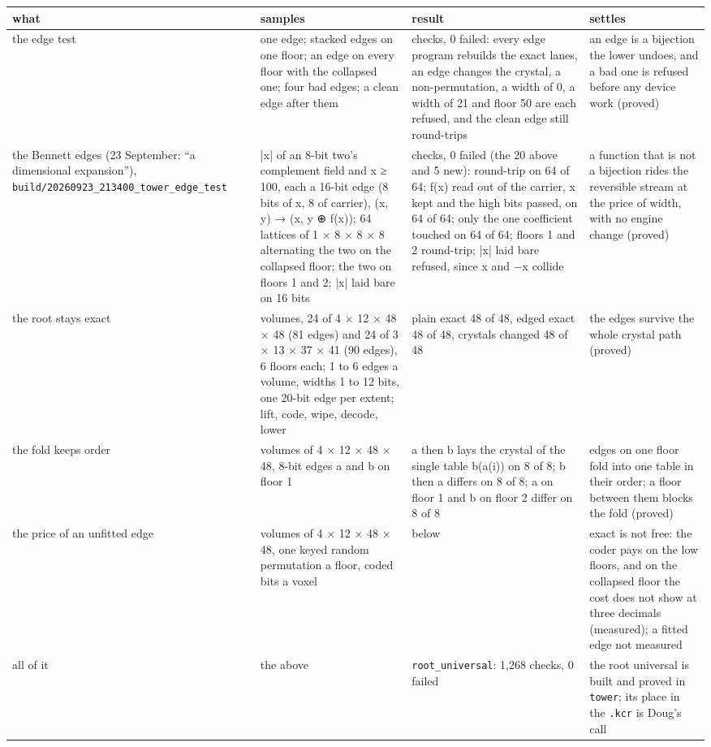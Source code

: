 {\footnotesize
\setlength{\tabcolsep}{6pt}
\begin{longtable}{>{\RaggedRight\arraybackslash}p{}>{\RaggedRight\arraybackslash}p{}>{\RaggedRight\arraybackslash}p{}>{\RaggedRight\arraybackslash}p{}}
\toprule
what & samples & result & settles \\
\midrule
\endhead
the edge test & one edge; stacked edges on one floor; an edge on every floor with the collapsed one; four bad edges; a clean edge after them & 20 checks, 0 failed: every edge program rebuilds the exact lanes, an edge changes the crystal, a non-permutation, a width of 0, a width of 21 and floor 50 are each refused, and the clean edge still round-trips & an edge is a bijection the lower undoes, and a bad one is refused before any device work (proved) \\
the Bennett edges (23 September: “a dimensional expansion”), \texttt{build/\allowbreak{}20260923\_\allowbreak{}213400\_\allowbreak{}tower\_\allowbreak{}edge\_\allowbreak{}test} & |x| of an 8-bit two's complement field and x ≥ 100, each a 16-bit edge (8 bits of x, 8 of carrier), (x, y) → (x, y ⊕ f(x)); 64 lattices of 1 × 8 × 8 × 8 alternating the two on the collapsed floor; the two on floors 1 and 2; |x| laid bare on 16 bits & 25 checks, 0 failed (the 20 above and 5 new): round-trip on 64 of 64; f(x) read out of the carrier, x kept and the high bits passed, on 64 of 64; only the one coefficient touched on 64 of 64; floors 1 and 2 round-trip; |x| laid bare refused, since x and −x collide & a function that is not a bijection rides the reversible stream at the price of width, with no engine change (proved) \\
the root stays exact & 48 volumes, 24 of 4 × 12 × 48 × 48 (81 edges) and 24 of 3 × 13 × 37 × 41 (90 edges), 6 floors each; 1 to 6 edges a volume, widths 1 to 12 bits, one 20-bit edge per extent; lift, code, wipe, decode, lower & plain exact 48 of 48, edged exact 48 of 48, crystals changed 48 of 48 & the edges survive the whole crystal path (proved) \\
the fold keeps order & 8 volumes of 4 × 12 × 48 × 48, 8-bit edges a and b on floor 1 & a then b lays the crystal of the single table b(a(i)) on 8 of 8; b then a differs on 8 of 8; a on floor 1 and b on floor 2 differ on 8 of 8 & edges on one floor fold into one table in their order; a floor between them blocks the fold (proved) \\
the price of an unfitted edge & 8 volumes of 4 × 12 × 48 × 48, one keyed random permutation a floor, coded bits a voxel & below & exact is not free: the coder pays on the low floors, and on the collapsed floor the cost does not show at three decimals (measured); a fitted edge not measured \\
all of it & the above & \texttt{root\_\allowbreak{}universal}: 1,268 checks, 0 failed & the root universal is built and proved in \texttt{tower}; its place in the \texttt{.\allowbreak{}kcr} is Doug's call \\
\bottomrule
\end{longtable}
}


